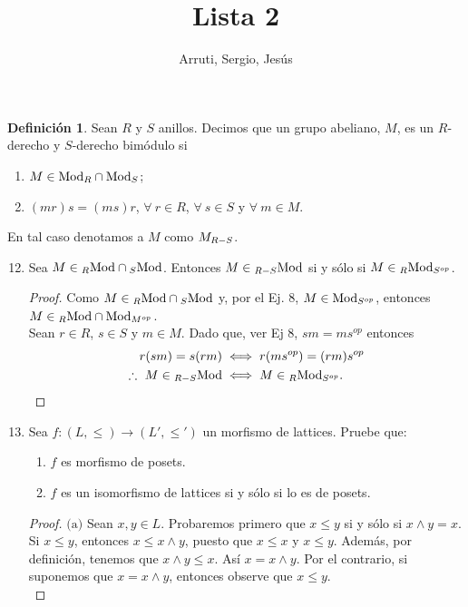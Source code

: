 \documentclass{article}
\title{Lista 2}
\author{Arruti, Sergio, Jesús}
\date{}
\newcommand{\lrprth}[1]{
	\left(#1\right)
}
\newcommand{\opst}[1]{
	{#1}^{op}
}
\newcommand{\ringmod}[3]{
	\if#3l
	{}_{#1}#2
	\else
	\if#3r
	#2_{#1}
	\fi
	\fi
}
\newcommand{\ringbimod}[4]{
	\if#4l
	{}_{#1-#2}#3
	\else
	\if#4r
	#3_{#1-#2}
	\else 
	\ifstrequal{#4}{lr}{
		{}_{#1}#3_{#2}
	}
	\fi
	\fi
}
\theoremstyle{definition}
\newtheorem{define}{Definición}
\theoremstyle{plain}
\theoremstyle{plain}
\theoremstyle{definition}
\theoremstyle{definition}
\theoremstyle{definition}
\theoremstyle{definition}
\theoremstyle{definition}
\theoremstyle{definition}
\begin{document}
\maketitle
\begin{define}
	Sean $R$ y $S$ anillos. Decimos que un grupo abeliano, $M$, es un $R$-derecho y $S$-derecho bimódulo si
	\begin{enumerate}[label=\roman*)]
		\item $M\in\ringmod{R}{\text{Mod}}{r}\cap\ringmod{S}{\text{Mod}}{r}$;
		\item $(mr)s=(ms)r$, $\forall\ r\in R$, $\forall\ s\in S$ y $\forall\ m\in M$.
	\end{enumerate}
	En tal caso denotamos a $M$ como $\ringbimod{R}{S}{M}{r}$.
\end{define}
\begin{enumerate}[label=\textbf{Ej \arabic*.}]
\setcounter{enumi}{11}

\item Sea $M\in\ringmod{R}{\text{Mod}}{l}\cap\ringmod{S}{\text{Mod}}{l}$. Entonces $M\in\ringbimod{R}{S}{\text{Mod}}{l}$ si y sólo si $M\in\ringbimod{R}{\opst{S}}{\text{Mod}}{lr}$.
\begin{proof}
	Como $M\in\ringmod{R}{\text{Mod}}{l}\cap\ringmod{S}{\text{Mod}}{l}$ y, por el Ej. 8, $M\in\ringmod{\opst{S}}{\text{Mod}}{r}$, entonces $M\in\ringmod{R}{\text{Mod}}{l}\cap\ringmod{\opst{M}}{\text{Mod}}{r}$.\\ Sean $r\in R$, $s\in S$ y $m\in M$. 
	Dado que, ver Ej 8, $sm=ms^{op}$ entonces 
	\begin{align*}
		r(sm)=s(rm)&\iff r(m\opst{s})=(rm)\opst{s}\\
		\therefore\  M\in\ringbimod{R}{S}{\text{Mod}}{l}&\iff M\in\ringbimod{R}{\opst{S}}{\text{Mod}}{lr}.
	\end{align*}
\end{proof}

\item Sea $f:\lrprth{L, \leq } \longrightarrow \lrprth{L', \leq '}$ un morfismo de lattices. Pruebe que:
\begin{enumerate}
	\item $f$ es morfismo de posets.
	\item $f$ es un isomorfismo de lattices si y sólo si lo es de posets.
\end{enumerate}
\begin{proof}
	$\boxed{\text{(a)}}$ Sean $x,y \in L$. Probaremos primero que $x \leq y$ si y sólo si $x \wedge y = x$. Si $x \leq y$, entonces $x \leq x \wedge y$, puesto que $x \leq x$ y $x \leq y$. Además, por definición, tenemos que $x \wedge y \leq x$. Así $x = x \wedge y$. Por el contrario, si suponemos que $x = x \wedge y$, entonces observe que $x \leq y$.\\
	

\end{proof}
\end{enumerate}
\end{document}
